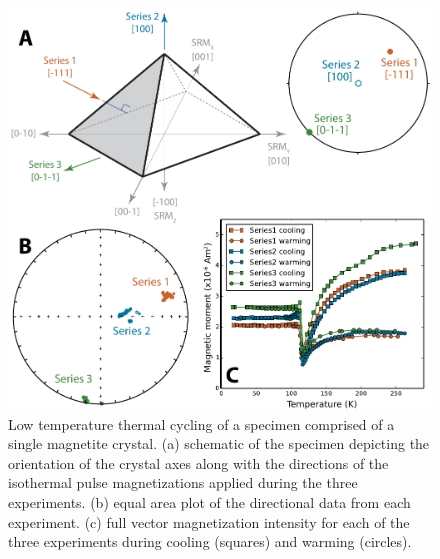 \documentclass[draft,gc]{AGUTeX}
\begin{document}
\begin{figure}
\noindent\includegraphics[width=\textwidth]{Magnetite1.pdf}
\caption{Low temperature thermal cycling of a specimen comprised of a single magnetite crystal. (a) schematic of the specimen depicting the orientation of the crystal axes along with the directions of the isothermal pulse magnetizations applied during the three experiments. (b) equal area plot of the directional data from each experiment. (c) full vector magnetization intensity for each of the three experiments during cooling (squares) and warming (circles).}
\label{fig:magnetite1}
\end{figure}
\end{document}
